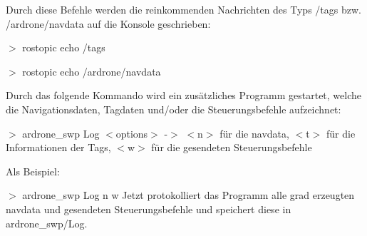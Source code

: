 Durch diese Befehle werden die reinkommenden Nachrichten des Typs /tags bzw. /ardrone/navdata auf die Konsole geschrieben:

$>$ rostopic echo /tags

$>$ rostopic echo /ardrone/navdata

Durch das folgende Kommando wird ein zusätzliches Programm gestartet, welche die Navigationsdaten, Tagdaten und/oder die Steuerungsbefehle aufzeichnet:

$>$ ardrone\_\-swp Log $<$options$>$ -\/$>$ $<$n$>$ für die navdata, $<$t$>$ für die Informationen der Tags, $<$w$>$ für die gesendeten Steuerungsbefehle

Als Beispiel:

$>$ ardrone\_\-swp Log n w Jetzt protokolliert das Programm alle grad erzeugten navdata und gesendeten Steuerungsbefehle und speichert diese in ardrone\_\-swp/Log. 